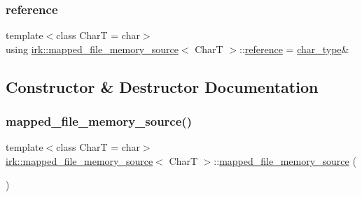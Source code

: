 \subsubsection{\texorpdfstring{reference}{reference}}
{\footnotesize\ttfamily template$<$class CharT  = char$>$ \\
using \mbox{\hyperlink{classirk_1_1mapped__file__memory__source}{irk\+::mapped\+\_\+file\+\_\+memory\+\_\+source}}$<$ CharT $>$\+::\mbox{\hyperlink{classirk_1_1mapped__file__memory__source_a4a2510b01a3bf4c3570617707b069bd6}{reference}} =  \mbox{\hyperlink{classirk_1_1mapped__file__memory__source_a9b4319787fae825c6a27be1e58447386}{char\+\_\+type}}\&}



\subsection{Constructor \& Destructor Documentation}
\mbox{\label{classirk_1_1mapped__file__memory__source_afda461084b8db2c179e990d8c8ab246c}} 
\subsubsection{\texorpdfstring{mapped\+\_\+file\+\_\+memory\+\_\+source()}{mapped\_file\_memory\_source()}\hspace{0.1cm}{\footnotesize\ttfamily [1/2]}}
{\footnotesize\ttfamily template$<$class CharT  = char$>$ \\
\mbox{\hyperlink{classirk_1_1mapped__file__memory__source}{irk\+::mapped\+\_\+file\+\_\+memory\+\_\+source}}$<$ CharT $>$\+::\mbox{\hyperlink{classirk_1_1mapped__file__memory__source}{mapped\+\_\+file\+\_\+memory\+\_\+source}} (\begin{DoxyParamCaption}{ }\end{DoxyParamCaption})\hspace{0.3cm}{\ttfamily [default]}}

\mbox{\label{classirk_1_1mapped__file__memory__source_aa17e232c1b1496742f4709f369500d65}} 
